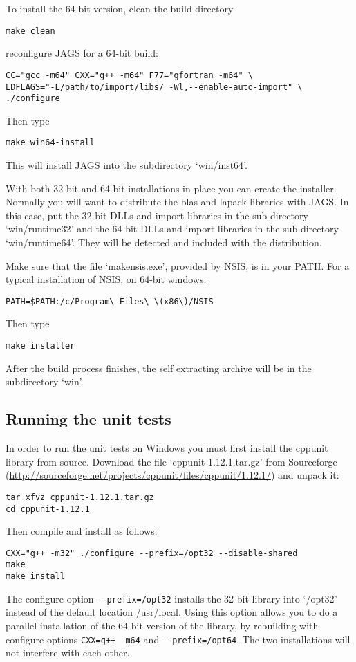 \documentclass[11pt, a4paper, titlepage]{article}
\newcommand{\file}[1]{{`\normalfont\textsf{#1}'}}
\begin{document}
To install the 64-bit version, clean the build directory 
\begin{verbatim}
make clean 
\end{verbatim}
reconfigure JAGS for a 64-bit build:
\begin{verbatim}
CC="gcc -m64" CXX="g++ -m64" F77="gfortran -m64" \
LDFLAGS="-L/path/to/import/libs/ -Wl,--enable-auto-import" \
./configure
\end{verbatim}
Then type
\begin{verbatim}
make win64-install
\end{verbatim}
This will install JAGS into the subdirectory \file{win/inst64}.

With both 32-bit and 64-bit installations in place you can create the
installer.  Normally you will want to distribute the blas and lapack
libraries with JAGS.  In this case, put the 32-bit DLLs and import
libraries in the sub-directory \file{win/runtime32} and the 64-bit
DLLs and import libraries in the sub-directory
\file{win/runtime64}. They will be detected and included with the
distribution.

Make sure that the file \file{makensis.exe}, provided by
NSIS, is in your PATH. For a typical installation of NSIS, on 64-bit
windows:
\begin{verbatim}
PATH=$PATH:/c/Program\ Files\ \(x86\)/NSIS
\end{verbatim}
Then type
\begin{verbatim}
make installer
\end{verbatim}
After the build process finishes, the self extracting archive will be
in the subdirectory \file{win}.

\subsection{Running the unit tests}

In order to run the unit tests on Windows you must first install the
cppunit library from source. Download the file \file{cppunit-1.12.1.tar.gz}
from Sourceforge (\url{http://sourceforge.net/projects/cppunit/files/cppunit/1.12.1/}) and
unpack it:
\begin{verbatim}
tar xfvz cppunit-1.12.1.tar.gz
cd cppunit-1.12.1
\end{verbatim}
Then compile and install as follows:
\begin{verbatim}
CXX="g++ -m32" ./configure --prefix=/opt32 --disable-shared
make
make install
\end{verbatim}
The configure option \verb+--prefix=/opt32+ installs the 32-bit
library into \file{/opt32} instead of the default location
{/usr/local}. Using this option allows you to do a parallel
installation of the 64-bit version of the library, by rebuilding with
configure options \verb|CXX=g++ -m64| and \verb+--prefix=/opt64+. The two
installations will not interfere with each other.
\end{document}
